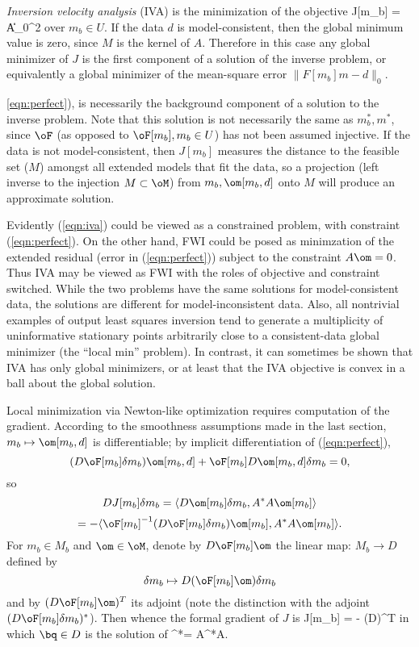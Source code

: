{\em Inversion velocity analysis} (IVA) is the minimization of the objective
\be
\label{eqn:iva}
J[m_b] = \|A\om[m_b,d]\|_0^2
\ee
over $m_b \in U$. If the data $d$ is model-consistent, then the global
minimum value is zero, since $M$ is the kernel of $A$. Therefore in
this case any global minimizer of $J$ is the first component of a
solution of the inverse problem, or equivalently a global minimizer of
the mean-square error $\|F[m_b]m-d\|_0$.

\ref{eqn:perfect}), is necessarily the background component of a
solution to the inverse problem. Note that this solution is not necessarily the
same as $m_b^*,m^*$, since $\oF$ (as opposed to $\oF[m_b], m_b \in U$)
has not been assumed injective.
If the data is not model-consistent, 
then $J[m_b]$ measures the distance to the feasible set ($M$) amongst
all extended models that fit the data, so a projection (left inverse
to the injection $M \subset \oM$) from $m_b,\om[m_b,d]$ onto $M$ will produce an
approximate solution. 

Evidently (\ref{eqn:iva}) could be viewed as a constrained problem,
with constraint (\ref{eqn:perfect}). On the other hand, FWI could be
posed as minimzation of the extended residual (error in
(\ref{eqn:perfect})) subject to the constraint $A\om=0$. Thus IVA
may be viewed as FWI with the roles of objective and
constraint switched. While the two problems have the same solutions
for model-consistent data, the solutions are different for
model-inconsistent data. Also, all nontrivial examples of output least
squares inversion tend to generate a 
multiplicity of uninformative stationary points arbitrarily close to a
consistent-data global minimizer (the ``local min''
problem). In contrast, it can sometimes be shown that IVA
has only global minimizers, or at least that the IVA objective
is convex in a ball about the global solution.

Local minimization via Newton-like optimization requires computation
of the gradient. According to the smoothness assumptions made in the
last section,  $m_b \mapsto \om[m_b,d]$ is differentiable; by implicit
differentiation of (\ref{eqn:perfect}),
\begin{equation}
\label{eqn:dperfect}
(D\oF[m_b]\delta m_b)\om[m_b,d] + \oF[m_b]D\om[m_b,d]\delta m_b = 0,
\end{equation}
so
\[
DJ[m_b]\delta m_b = \langle D\om[m_b]\delta m_b, A^*A\om[m_b]\rangle
\]
\begin{equation}
\label{eqn:naive_jderiv}
= -\langle \oF[m_b]^{-1}(D\oF[m_b]\delta m_b)\om[m_b],A^*A\om[m_b]\rangle.
\end{equation}
For $m_b \in M_b$ and $\om \in \oM$, denote by $D\oF[m_b]\om$ the
linear map: $M_b \rightarrow D$ defined by
\[
\delta m_b \mapsto D(\oF[m_b]\om)\delta m_b
\]
and by $(D\oF[m_b]\om)^T$ its adjoint (note the distinction with the
adjoint $(D\oF[m_b]\delta m_b)^*$). Then 
whence the formal gradient of $J$ is
\be
\label{eqn:naive0_g}
\nabla J[m_b] = - (D\oF[m_b]\om[m_b])^T\bq[m_b]
\ee
in which $\bq \in D$ is the solution of
\be
\label{eqn:naive0_q}
\oF[m_b]^*\bq = A^*A\om[m_b].
\ee

